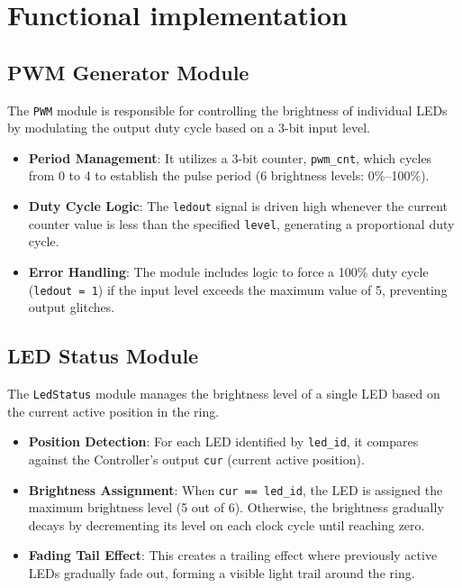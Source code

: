 \section{Functional implementation}


\subsection{PWM Generator Module}
The \texttt{PWM} module is responsible for controlling the brightness of individual LEDs by modulating the output duty cycle based on a 3-bit input level.
\begin{itemize}[noitemsep]
    \item \textbf{Period Management}: It utilizes a 3-bit counter, \texttt{pwm\_cnt}, which cycles from 0 to 4 to establish the pulse period (6 brightness levels: 0\%–100\%).
    \item \textbf{Duty Cycle Logic}: The \texttt{ledout} signal is driven high whenever the current counter value is less than the specified \texttt{level}, generating a proportional duty cycle.
    \item \textbf{Error Handling}: The module includes logic to force a 100\% duty cycle (\texttt{ledout = 1}) if the input level exceeds the maximum value of 5, preventing output glitches.
\end{itemize}

\subsection{LED Status Module}
The \texttt{LedStatus} module manages the brightness level of a single LED based on the current active position in the ring.
\begin{itemize}[noitemsep]
    \item \textbf{Position Detection}: For each LED identified by \texttt{led\_id}, it compares against the Controller's output \texttt{cur} (current active position).
    \item \textbf{Brightness Assignment}: When \texttt{cur == led\_id}, the LED is assigned the maximum brightness level (5 out of 6). Otherwise, the brightness gradually decays by decrementing its level on each clock cycle until reaching zero.
    \item \textbf{Fading Tail Effect}: This creates a trailing effect where previously active LEDs gradually fade out, forming a visible light trail around the ring.
\end{itemize}

